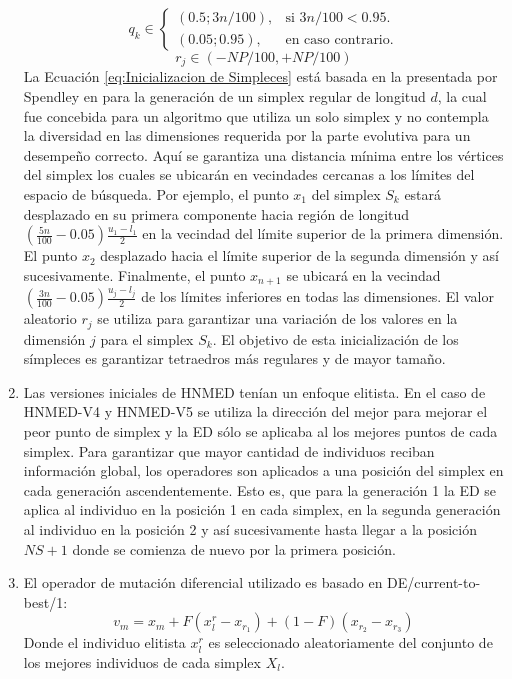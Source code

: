 \begin{enumerate}
	\begin{equation}
	q_k \in \begin{cases}
	(0.5;3n/100), & \text{si $3n/100 <0.95$}.\\
	(0.05;0.95), & \text{en caso contrario}.
	\end{cases}
	\end{equation}
	\begin{equation}
	r_j \in (-NP/100,+NP/100) 
	\end{equation}
	La Ecuación \ref{eq:Inicializacion de Simpleces} está basada en la presentada por Spendley en \cite{spendley_sequential_1962} para la generación de un simplex regular de longitud $d$, la cual fue concebida para un algoritmo que utiliza un solo simplex y no contempla la diversidad en las dimensiones requerida por la parte evolutiva para un desempeño correcto. Aquí se garantiza una distancia mínima entre los vértices del simplex los cuales se ubicarán en vecindades cercanas a los límites del espacio de búsqueda. Por ejemplo, el punto $x_1$ del simplex $S_k$  estará desplazado en su primera componente hacia región de longitud $(\frac{5n}{100}-0.05)\frac{u_1-l_1}{2}$ en la vecindad del límite superior de la primera dimensión. El punto $x_2$ desplazado hacia el límite superior de la segunda dimensión y así sucesivamente. Finalmente, el punto $x_{n+1}$ se ubicará en la vecindad $(\frac{3n}{100}-0.05)\frac{u_j-l_j}{2}$ de los límites inferiores en todas las dimensiones. El valor aleatorio $r_j$ se utiliza para garantizar una variación de los valores en la dimensión $j$ para el simplex $S_k$. El objetivo de esta inicialización de los símpleces es garantizar tetraedros más regulares y de mayor tamaño. 
	
	\item Las versiones iniciales de HNMED tenían un enfoque elitista. En el caso de HNMED-V4 y HNMED-V5 se utiliza la dirección del mejor para mejorar el peor punto de simplex y la ED sólo se aplicaba al los mejores puntos de cada simplex. Para garantizar que mayor cantidad de individuos reciban información global, los operadores son aplicados a una posición del simplex en cada generación ascendentemente. Esto es, que para la generación 1 la ED se aplica al individuo en la posición 1 en cada simplex, en la segunda generación al individuo en la posición 2 y así sucesivamente hasta llegar a la posición $NS+1$ donde se comienza de nuevo por la primera posición.  
	\item El operador de mutación diferencial utilizado es basado en DE/current-to-best/1:
	\begin{equation}
	v_m= x_m+F(x^r_l-x_{r_1})+(1-F)(x_{r_2}-x_{r_3})
	\end{equation}
	Donde el individuo elitista $x^r_l$ es seleccionado aleatoriamente del conjunto de los mejores individuos de cada simplex $X_l$. 
\end{enumerate}


